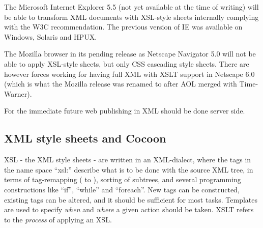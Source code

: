 The Microsoft Internet Explorer 5.5 (not yet available at the time of
writing) will be able to transform XML documents with XSL-style sheets
internally complying with the W3C recommendation.  The previous
version of IE was available on Windows, Solaris and HPUX.

The Mozilla browser in its pending release as Netscape Navigator 5.0
will not be able to apply XSL-style sheets, but only CSS cascading
style sheets.  There are however forces working for having full XML
with XSLT support in Netscape 6.0 (which is what the Mozilla release
was renamed to after AOL merged with Time-Warner).

For the immediate future web publishing in XML should be done server side.


%
%
%
%
%

\subsection{XML style sheets and Cocoon}

XSL - the XML style sheets - are written in an XML-dialect, where the
tags in the name space ``xsl:'' describe what is to be done with the
source XML tree, in terms of tag-remapping ( to ),
sorting of subtrees, and several programming constructions like
``if'', ``while'' and ``foreach''.  New tags can be constructed,
existing tags can be altered, and it should be sufficient for most
tasks.  Templates are used to specify \textit{when} and \textit{where}
a given action should be taken.   XSLT refers to the \textit{process}
of applying an XSL.


% 



